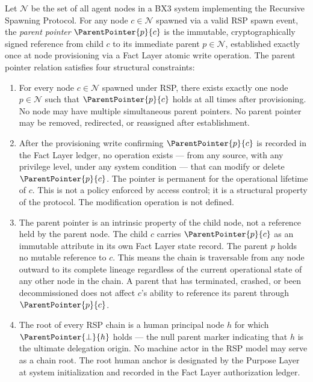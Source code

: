 \documentclass[12pt]{article}
\def\bxthree{BX3}
\begin{document}
\begin{dfn}
\label{dfn:parent-pointer}
Let $\mathcal{N}$ be the set of all agent nodes in a \bxthree{} system implementing the Recursive Spawning Protocol. For any node $c \in \mathcal{N}$ spawned via a valid RSP spawn event, the \emph{parent pointer} $\ParentPointer{p}{c}$ is the immutable, cryptographically signed reference from child $c$ to its immediate parent $p \in \mathcal{N}$, established exactly once at node provisioning via a Fact Layer atomic write operation. The parent pointer relation satisfies four structural constraints:

\begin{enumerate}
    \item[(P1) \textbf{Uniqueness}] For every node $c \in \mathcal{N}$ spawned under RSP, there exists exactly one node $p \in \mathcal{N}$ such that $\ParentPointer{p}{c}$ holds at all times after provisioning. No node may have multiple simultaneous parent pointers. No parent pointer may be removed, redirected, or reassigned after establishment.

    \item[(P2) \textbf{Immutability}] After the provisioning write confirming $\ParentPointer{p}{c}$ is recorded in the Fact Layer ledger, no operation exists — from any source, with any privilege level, under any system condition — that can modify or delete $\ParentPointer{p}{c}$. The pointer is permanent for the operational lifetime of $c$. This is not a policy enforced by access control; it is a structural property of the protocol. The modification operation is not defined.

    \item[(P3) \textbf{Directionality}] The parent pointer is an intrinsic property of the child node, not a reference held by the parent node. The child $c$ carries $\ParentPointer{p}{c}$ as an immutable attribute in its own Fact Layer state record. The parent $p$ holds no mutable reference to $c$. This means the chain is traversable from any node outward to its complete lineage regardless of the current operational state of any other node in the chain. A parent that has terminated, crashed, or been decommissioned does not affect $c$'s ability to reference its parent through $\ParentPointer{p}{c}$.

    \item[(P4) \textbf{Human Anchor Termination}] The root of every RSP chain is a human principal node $h$ for which $\ParentPointer{\bot}{h}$ holds — the null parent marker indicating that $h$ is the ultimate delegation origin. No machine actor in the RSP model may serve as a chain root. The root human anchor is designated by the Purpose Layer at system initialization and recorded in the Fact Layer authorization ledger.
\end{enumerate}
\end{dfn}
\end{document}
